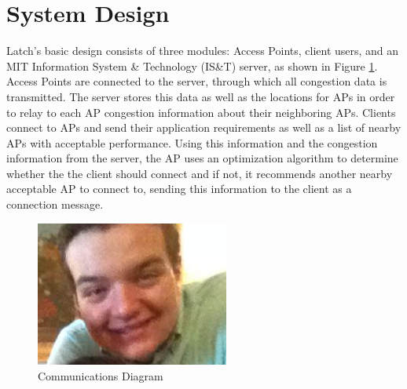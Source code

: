 \documentclass[journal]{IEEEtran}
\begin{document}

%
%
\section{System Design}
Latch's basic design consists of three modules: Access Points, client users, and an MIT Information System \& Technology (IS\&T) server, as shown in Figure \ref{comm_diagram}.  Access Points are connected to the server, through which all congestion data is transmitted. The server stores this data as well as the locations for APs in order to relay to each AP congestion information about their neighboring APs. Clients connect to APs and send their application requirements as well as a list of nearby APs with acceptable performance. Using this information and the congestion information from the server, the AP uses an optimization algorithm to determine whether the the client should connect and if not, it recommends another nearby acceptable AP to connect to, sending this information to the client as a connection message.

\begin{figure}[!t]
\centering
\includegraphics[width=2.5in]{john.png}
\caption{Communications Diagram}
\label{comm_diagram}
\end{figure}
\end{document}
